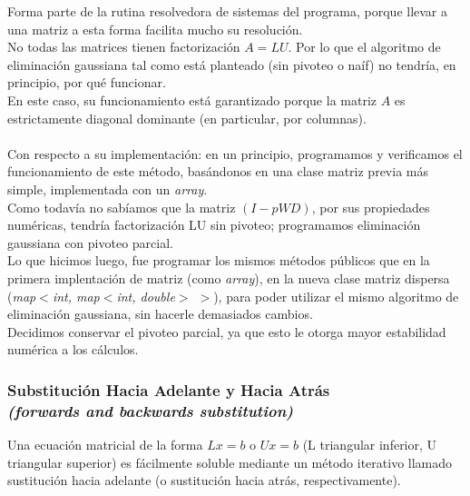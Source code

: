 			Forma parte de la rutina resolvedora de sistemas del programa, porque llevar a una matriz a esta forma facilita mucho su resolución. \\

			No todas las matrices tienen factorización $A=LU$. Por lo que el algoritmo de eliminación gaussiana tal como está planteado (sin pivoteo o naíf) no tendría, en principio, por qué funcionar. \\

			En este caso, su funcionamiento está garantizado porque la matriz $A$ es estrictamente diagonal dominante (en particular, por columnas). \\

			\quad \\

				Con respecto a su implementación: en un principio, programamos y verificamos el funcionamiento de este método, basándonos en una clase matriz previa más simple, implementada con un \textit{array}. \\

				Como todavía no sabíamos que la matriz $(I-pWD)$, por sus propiedades numéricas, tendría factorización LU sin pivoteo; programamos eliminación gaussiana con pivoteo parcial. \\ %

				Lo que hicimos luego, fue programar los mismos métodos públicos que en la primera implentación de matriz (como \textit{array}), en la nueva clase matriz dispersa (\textit{map$<$int, map$<$int, double$>$ $>$}), para poder utilizar el mismo algoritmo de eliminación gaussiana, sin hacerle demasiados cambios. \\

				Decidimos conservar el pivoteo parcial, ya que esto le otorga mayor estabilidad numérica a los cálculos. \\ %

		\subsubsection{Substitución Hacia Adelante y Hacia Atrás\\ \textit{(forwards and backwards substitution)}}

			Una ecuación matricial de la forma $Lx = b$ o $Ux = b$ (L triangular inferior, U triangular superior) es fácilmente soluble mediante un método iterativo llamado sustitución hacia adelante (o sustitución hacia atrás, respectivamente). \\

